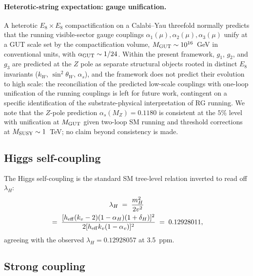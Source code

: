 ﻿\documentclass[reprint,amsmath,amssymb,aps,prd,longbibliography,floatfix]{revtex4-2}
\begin{document}
\paragraph{Heterotic-string expectation: gauge unification.}
A heterotic $E_8 \times E_8$ compactification on a Calabi--Yau
threefold normally predicts that the running visible-sector gauge
couplings $\alpha_1(\mu), \alpha_2(\mu), \alpha_3(\mu)$ unify at a
GUT scale set by the compactification volume,
$M_{\rm GUT} \sim 10^{16}$~GeV in conventional units, with
$\alpha_{\rm GUT} \sim 1/24$. Within the present framework, $g_1$,
$g_2$, and $g_3$ are predicted at the $Z$ pole as separate
structural objects rooted in distinct $E_8$ invariants ($k_W$,
$\sin^2\theta_W$, $\alpha_s$), and the framework does not predict
their evolution to high scale: the reconciliation of the predicted
low-scale couplings with one-loop unification of the running
couplings is left for future work, contingent on a specific
identification of the substrate-physical interpretation of RG
running. We note that the $Z$-pole prediction
$\alpha_s(M_Z) = 0.1180$ is consistent at the $5\%$ level with
unification at $M_{\rm GUT}$ given two-loop SM running and
threshold corrections at $M_{\rm SUSY} \sim 1$~TeV; no claim
beyond consistency is made.

\subsection{Higgs self-coupling}

The Higgs self-coupling is the standard SM tree-level relation
inverted to read off $\lambda_H$:
\begin{multline}
\lambda_H \;=\; \frac{m_H^2}{2 v^2} \\
            \;=\; \frac{[h_{\rm eff} (k_v - 2)(1 - \alpha_H)(1 + \delta_H)]^2}{2 [h_{\rm eff} k_v (1 - \alpha_v)]^2}
            \;=\; 0.12928011,
\label{eq:lambdaH-derived}
\end{multline}
agreeing with the observed $\lambda_H = 0.12928057$ at \SI{3.5}{ppm}.

\subsection{Strong coupling}
\end{document}
